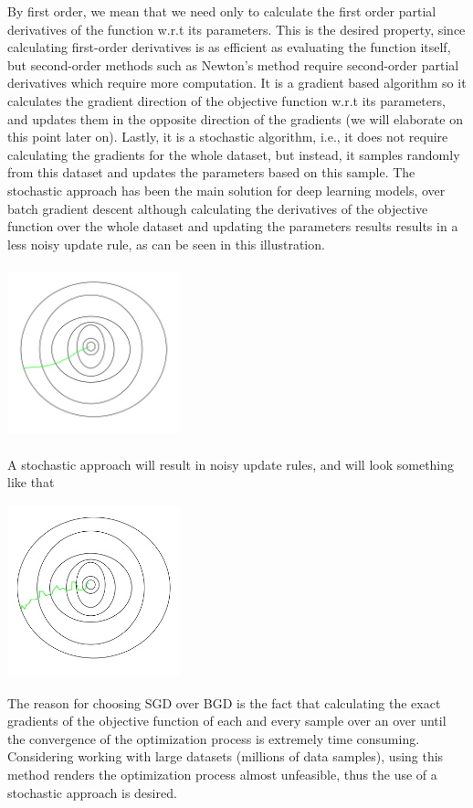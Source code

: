 \documentclass[10pt,a4paper]{article}
\begin{document}
By first order, we mean that we need only to calculate the first order partial derivatives of the function w.r.t its parameters. This is the desired property, since calculating first-order derivatives is as efficient as evaluating the function itself, but second-order methods such as Newton's method require second-order partial derivatives which require more computation. It is a gradient based algorithm so it calculates the gradient direction of the objective function w.r.t its parameters, and updates them in the opposite direction of the gradients (we will elaborate on this point later on). Lastly, it is a stochastic algorithm, i.e., it does not require calculating the gradients for the whole dataset, but instead, it samples randomly from this dataset and updates the parameters based on this sample. The stochastic approach has been the main solution for deep learning models, over batch gradient descent although calculating the derivatives of the objective function over the whole dataset and updating the parameters results results in a less noisy update rule, as can be seen in this illustration.\\
\begin{center}
\includegraphics[width=5cm, height=5cm]{BGD.png}
\end{center}
A stochastic approach will result in noisy update rules, and will look something like that\\
\begin{center}

    \includegraphics[width=5cm, height=5cm]{SGD.jpg}
\end{center}
The reason for choosing SGD over BGD is the fact that calculating the exact gradients of the objective function of each and every sample over an over until the convergence of the optimization process is extremely time consuming.
Considering working with large datasets (millions of data samples), using this method renders the optimization process almost unfeasible, thus the use of a stochastic approach is desired.
\end{document}
